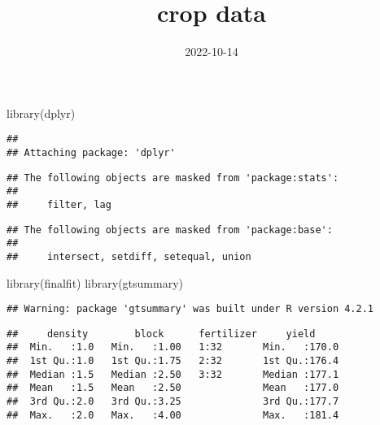 \documentclass[
]{article}
\title{crop data}
\author{}
\date{\vspace{-2.5em}2022-10-14}
\newenvironment{Shaded}{\begin{snugshade}}{\end{snugshade}}
\newcommand{\FunctionTok}[1]{\textcolor[rgb]{0.00,0.00,0.00}{#1}}
\newcommand{\NormalTok}[1]{#1}
\newcommand{\OtherTok}[1]{\textcolor[rgb]{0.56,0.35,0.01}{#1}}
\newcommand{\SpecialCharTok}[1]{\textcolor[rgb]{0.00,0.00,0.00}{#1}}
\newcommand{\StringTok}[1]{\textcolor[rgb]{0.31,0.60,0.02}{#1}}
\begin{document}
\maketitle

\begin{Shaded}
\begin{Highlighting}[]
\FunctionTok{library}\NormalTok{(dplyr)}
\end{Highlighting}
\end{Shaded}

\begin{verbatim}
## 
## Attaching package: 'dplyr'
\end{verbatim}

\begin{verbatim}
## The following objects are masked from 'package:stats':
## 
##     filter, lag
\end{verbatim}

\begin{verbatim}
## The following objects are masked from 'package:base':
## 
##     intersect, setdiff, setequal, union
\end{verbatim}

\begin{Shaded}
\begin{Highlighting}[]
\FunctionTok{library}\NormalTok{(finalfit)}
\FunctionTok{library}\NormalTok{(gtsummary)}
\end{Highlighting}
\end{Shaded}

\begin{verbatim}
## Warning: package 'gtsummary' was built under R version 4.2.1
\end{verbatim}

\begin{Shaded}
\end{Shaded}

\begin{verbatim}
##     density        block      fertilizer     yield      
##  Min.   :1.0   Min.   :1.00   1:32       Min.   :170.0  
##  1st Qu.:1.0   1st Qu.:1.75   2:32       1st Qu.:176.4  
##  Median :1.5   Median :2.50   3:32       Median :177.1  
##  Mean   :1.5   Mean   :2.50              Mean   :177.0  
##  3rd Qu.:2.0   3rd Qu.:3.25              3rd Qu.:177.7  
##  Max.   :2.0   Max.   :4.00              Max.   :181.4
\end{verbatim}
\end{document}
